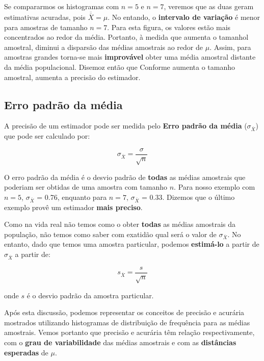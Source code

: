 \documentclass[
]{book}
\begin{document}
Se compararmos os histogramas com \(n = 5\) e \(n = 7\), veremos que as duas geram estimativas acuradas, pois \(\overline{\overline{X}} = \mu\). No entando, o \textbf{intervalo de variação} é menor para amostras de tamanho \(n = 7\). Para esta figura, os valores estão mais concentrados ao redor da média. Portanto, à medida que aumenta o tamanhol amostral, diminui a disparsão das médias amostrais ao redor de \(\mu\). Assim, para amostras grandes torna-se mais \textbf{improvável} obter uma média amostral distante da média populacional. Disemoz então que Conforme aumenta o tamanho amostral, aumenta a precisão do estimador.

\hypertarget{erro-padruxe3o-da-muxe9dia}{%
\subsection{Erro padrão da média}\label{erro-padruxe3o-da-muxe9dia}}

A precisão de um estimador pode ser medida pelo \textbf{Erro padrão da média} (\(\sigma_{\overline{X}}\)) que pode ser calculado por:

\[\sigma_{\overline{X}} = \frac{\sigma}{\sqrt{n}}\]

O erro padrão da média é o desvio padrão de \textbf{todas} as médias amostrais que poderiam ser obtidas de uma amostra com tamanho \(n\). Para nosso exemplo com \(n = 5\), \(\sigma_{\overline{X}}\) = 0.76, enquanto para \(n = 7\), \(\sigma_{\overline{X}}\) = 0.33. Dizemos que o último exemplo provê um estimador \textbf{mais preciso}.

Como na vida real não temos como o obter \textbf{todas} as médias amostrais da população, não temos como saber com exatidão qual será o valor de \(\sigma_{\overline{X}}\). No entanto, dado que temos uma amostra particular, podemos \textbf{estimá-lo} a partir de \(\sigma_{\overline{X}}\) a partir de:

\[s_{\overline{X}} = \frac{s}{\sqrt{n}}\]

onde \(s\) é o desvio padrão da amostra particular.

Após esta discussão, podemos representar os conceitos de precisão e acurária mostrados utilizando histogramas de distribuição de frequência para as médias amostrais. Vemos portanto que precisão e acurária têm relação respectivamente, com o \textbf{grau de variabilidade} das médias amostrais e com as \textbf{distâncias esperadas} de \(\mu\).
\end{document}
